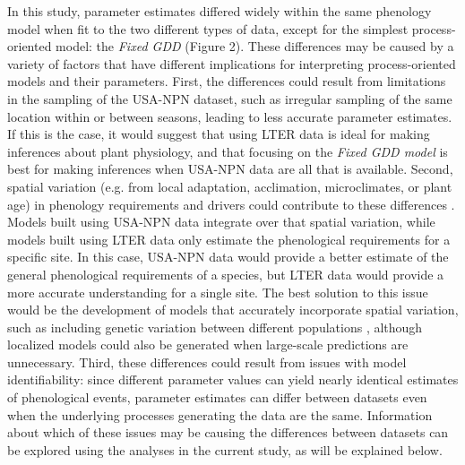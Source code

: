 \documentclass[fleqn,12pt,lineno]{article}
\begin{document}
In this study, parameter estimates differed widely within the same phenology model when fit to the two different types of data, except for the simplest process-oriented model: the \textit{Fixed GDD} (Figure 2). These differences may be caused by a variety of factors that have different implications for interpreting process-oriented models and their parameters. First, the differences could result from limitations in the sampling of the USA-NPN dataset, such as irregular sampling of the same location within or between seasons, leading to less accurate parameter estimates. If this is the case, it would suggest that using LTER data is ideal for making inferences about plant physiology, and that focusing on the \textit{Fixed GDD model} is best for making inferences when USA-NPN data are all that is available. Second, spatial variation (e.g. from local adaptation, acclimation, microclimates, or plant age)  in phenology requirements and drivers could contribute to these differences \citep{diez2012, zhang2017}. Models built using USA-NPN data integrate over that spatial variation, while models built using LTER data only estimate the phenological requirements for a specific site. In this case, USA-NPN data would provide a better estimate of the general phenological requirements of a species, but LTER data would provide a more accurate understanding for a single site. The best solution to this issue would be the development of models that accurately incorporate spatial variation, such as including genetic variation between different populations \citep{chuine2017}, although localized models could also be generated when large-scale predictions are unnecessary. Third, these differences could result from issues with model identifiability: since different parameter values can yield nearly identical estimates of phenological events, parameter estimates can differ between datasets even when the underlying processes generating the data are the same. Information about which of these issues may be causing the differences between datasets can be explored using the analyses in the current study, as will be explained below.
\end{document}
